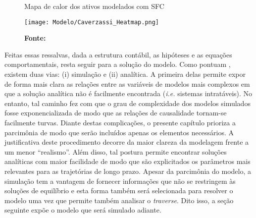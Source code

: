 \begin{figure}[H]
	\centering
	\caption{Mapa de calor dos ativos modelados com SFC}
	\label{Heatmap}
	\texttt{[image: Modelo/Caverzassi\_Heatmap.png]}
	\caption*{\textbf{Fonte:} \textcite[p.~4]{caverzasi_stock-flow_2013}}
\end{figure}






Feitas essas ressalvas, dada a estrutura contábil, as hipóteses e as equações comportamentais, resta seguir para a solução do modelo. Como pontuam \textcite{caverzasi_stock-flow_2013}, existem duas vias: (i) simulação e (ii) analítica. A primeira delas permite expor de forma mais clara as relações entre as variáveis de modelos mais complexos em que a solução analítica não é facilmente encontrada (\textit{i.e.} sistemas intratáveis). No entanto, tal caminho fez com que o grau de complexidade dos modelos simulados fosse exponencializada de modo que as relações de causalidade tornam-se facilmente turvas. Diante destas complicações, o presente capítulo prioriza a parcimônia de modo que serão incluídos apenas os elementos necessários. A justificativa deste procedimento decorre da maior clareza da modelagem frente a um menor ``realismo''.
Além disso, tal postura permite encontrar soluções analíticas com maior facilidade de modo que são explicitados os parâmetros mais relevantes para as trajetórias de longo prazo. Apesar da parcimônia do modelo, a simulação tem a vantagem
de fornecer informações que não se restringem às soluções de equilíbrio e esta forma
também será selecionada para resolver o modelo uma vez que permite também analisar o \textit{traverse}.
Dito isso, a seção seguinte expõe o modelo que será simulado adiante.
